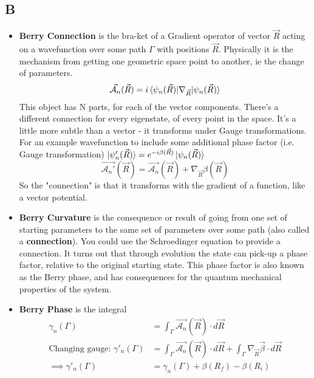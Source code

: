 \documentclass[../mattg_ti-fii_lit-review.tex]{subfiles}
\begin{document}
	\subsection{B}
	\begin{itemize}
		\item 
			\textbf{Berry Connection} is the bra-ket of a Gradient operator of vector $\vec{R}$ acting on a wavefunction over some path  $\Gamma$ with positions $\vec{R}$. Physically it is the mechanism from getting one geometric space point to another, ie the change of parameters.
			\begin{equation}
				\vec{\mathcal{A}_n}(\vec{R}) = i\braket{\psi_n(\vec{R})|\nabla_{\vec{R}}|\psi_n(\vec{R})}
			\end{equation}
			This object has N parts, for each of the vector components. There's a different connection for every eigenstate, of every point in the space. 
			It's a little more subtle than a vector - it transforms under Gauge transformations. For an example wavefunction to include some additional phase factor (i.e. Gauge transformation) $\ket{\psi_n'(\vec{R})}=e^{-i\beta(\vec{R})}\ket{\psi_n(\vec{R})}$
			\begin{equation}
				\vec{\mathcal{A}_n'}(\vec{R}) = \vec{\mathcal{A}_n}(\vec{R}) + \nabla_{\vec{R}}\beta(\vec{R})
			\end{equation}
			So the "connection" is that it transforms with the gradient of a function, like a vector potential.
		\item 
			\textbf{Berry Curvature} is the consequence or result of going from one set of starting parameters to the same set of parameters over some path (also called a \textbf{connection}). You could use the Schroedinger equation to provide a connection. It turns out that through evolution the state can pick-up a phase factor, relative to the original starting state. This phase factor is also known as the Berry phase, and has consequences for the quantum mechanical properties of the system.
		\item 
			\textbf{Berry Phase} is the integral
			\begin{align}
				\gamma_n(\Gamma) &= \int_\Gamma \vec{\mathcal{A}_n}(\vec{R})\cdot d\vec{R}\\
				\text{Changing gauge: }\gamma'_n(\Gamma) &= \int_\Gamma \vec{\mathcal{A}_n}(\vec{R})\cdot d\vec{R} + \int_\Gamma \nabla_{\vec{R}}\vec{\beta} \cdot d\vec{R}\\
				\implies \gamma'_n(\Gamma) &= \gamma_n(\Gamma) + \beta(R_f) - \beta(R_i)
			\end{align}

\end{itemize}
\end{document}
